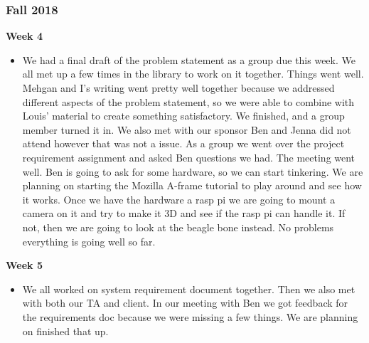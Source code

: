 \subsubsection{Fall 2018}
            \textbf{Week 4}
            \begin{itemize}
                \item We had a final draft of the problem statement as a group due this week. We all met up a few times in the library to work on it together. Things went well. Mehgan and I’s writing went pretty well together because we addressed different aspects of the problem statement, so we were able to combine with Louis’ material to create something satisfactory. We finished, and a group member turned it in. We also met with our sponsor Ben and Jenna did not attend however that was not a issue. As a group we went over the project requirement assignment and asked Ben questions we had. The meeting went well. Ben is going to ask for some hardware, so we can start tinkering. We are planning on starting the Mozilla A-frame tutorial to play around and see how it works. Once we have the hardware a rasp pi we are going to mount a camera on it and try to make it 3D and see if the rasp pi can handle it. If not, then we are going to look at the beagle bone instead. No problems everything is going well so far.
            \end{itemize}
            
            \textbf{Week 5}
            \begin{itemize}
                \item We all worked on system requirement document together. Then we also met with both our TA and client. In our meeting with Ben we got feedback for the requirements doc because we were missing a few things. We are planning on finished that up.
            \end{itemize}
            
